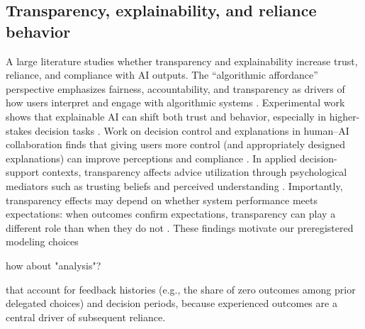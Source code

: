 \documentclass[a4paper, 12pt, fleqn]{article}
\theoremstyle{definition}
\begin{document}
\subsection{Transparency, explainability, and reliance behavior}
A large literature studies whether transparency and explainability increase trust, reliance, and compliance with AI outputs. The ``algorithmic affordance'' perspective emphasizes fairness, accountability, and transparency as drivers of how users interpret and engage with algorithmic systems \citep{Shin2019}. Experimental work shows that explainable AI can shift both trust and behavior, especially in higher-stakes decision tasks \citep{Leichtmann2023}. Work on decision control and explanations in human--AI collaboration finds that giving users more control (and appropriately designed explanations) can improve perceptions and compliance \citep{Westphal2023}. In applied decision-support contexts, transparency affects advice utilization through psychological mediators such as trusting beliefs and perceived understanding \citep{Ning2024}. Importantly, transparency effects may depend on whether system performance meets expectations: when outcomes confirm expectations, transparency can play a different role than when they do not \citep{Sun2026}. These findings motivate our preregistered modeling choices 
\begin{icomm}
	how about "analysis"?
\end{icomm}
that account for feedback histories (e.g., the share of zero outcomes among prior delegated choices) and decision periods, because experienced outcomes are a central driver of subsequent reliance.
\end{document}
